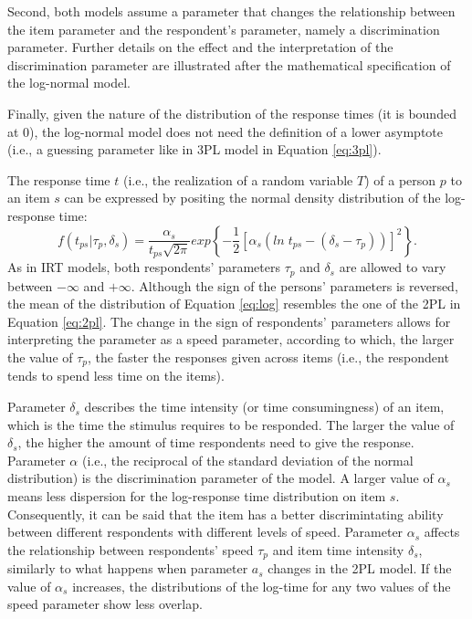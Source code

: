 \documentclass[12pt]{book}
\begin{document}
Second, both models assume a parameter that changes the relationship between the item parameter and the respondent's parameter, namely a discrimination parameter. Further details on the effect and the interpretation of the discrimination parameter are illustrated after the mathematical specification of the log-normal model. 

Finally, given the nature of the distribution of the response times (it is bounded at 0), the log-normal model does not need the definition of a lower asymptote (i.e., a guessing parameter like in 3PL model in Equation \ref{eq:3pl}).

The response time $t$ (i.e., the realization of a random variable $T$) of a person $p$ to an item $s$ can be expressed by positing the normal density distribution of the log-response time: 
%
\begin{equation}\label{eq:log}
	f(t_{ps}| \tau_p, \delta_s) = \frac{\alpha_s}{t_{ps}\sqrt{2\pi}}exp\left\{ -\frac{1}{2}[\alpha_s(ln\;t_{ps} - (\delta_s - \tau_p))]^2 \right\}.
\end{equation} 
%
As in IRT models, both respondents' parameters $\tau_p$ and $\delta_s$ are allowed to vary between $- \infty$ and $+ \infty$. Although the sign of the persons' parameters is reversed, the mean of the distribution of Equation \ref{eq:log} resembles the one of the 2PL in Equation \ref{eq:2pl}. 
The change in the sign of respondents' parameters allows for interpreting the parameter as a speed parameter, according to which, the larger the value of $\tau_p$, the faster the responses given across items (i.e., the respondent tends to spend less time on the items). 

Parameter $\delta_s$ describes the time intensity (or time consumingness)  of an item, which is the time the stimulus requires to be responded. The larger the value of $\delta_s$, the higher the amount of time respondents need to give the response.
Parameter $\alpha$ (i.e., the reciprocal of the standard deviation of the normal distribution) is the discrimination parameter of the model. A larger value of $\alpha_s$ means less dispersion for the log-response time distribution on item $s$. Consequently, it can be said that the item has a better discrimintating ability between different respondents with different levels of speed. 
Parameter $\alpha_s$ affects the relationship between respondents' speed $\tau_p$ and item time intensity $\delta_s$, similarly to what happens when parameter $a_s$ changes in the 2PL model. 
If the value of $\alpha_s$ increases, the distributions of the log-time for any two values of the speed parameter show less overlap. 
\end{document}

